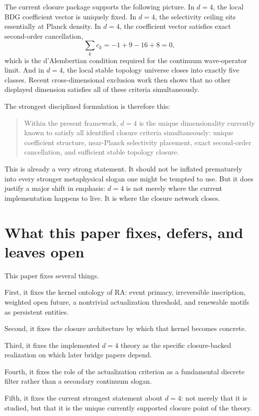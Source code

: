 \documentclass[11pt]{article}
\begin{document}
The current closure package supports the following picture. In $d=4$, the local BDG coefficient vector is uniquely fixed. In $d=4$, the selectivity ceiling sits essentially at Planck density. In $d=4$, the coefficient vector satisfies exact second-order cancellation,
\[
\sum_k c_k = -1 + 9 - 16 + 8 = 0,
\]
which is the d'Alembertian condition required for the continuum wave-operator limit. And in $d=4$, the local stable topology universe closes into exactly five classes. Recent cross-dimensional exclusion work then shows that no other displayed dimension satisfies all of these criteria simultaneously.

The strongest disciplined formulation is therefore this:
\begin{quote}
Within the present framework, $d=4$ is the unique dimensionality currently known to satisfy all identified closure criteria simultaneously: unique coefficient structure, near-Planck selectivity placement, exact second-order cancellation, and sufficient stable topology closure.
\end{quote}

This is already a very strong statement. It should not be inflated prematurely into every stronger metaphysical slogan one might be tempted to use. But it does justify a major shift in emphasis: $d=4$ is not merely where the current implementation happens to live. It is where the closure network closes.

\section{What this paper fixes, defers, and leaves open}\label{sec:scope}
This paper fixes several things.

First, it fixes the kernel ontology of RA: event primacy, irreversible inscription, weighted open future, a nontrivial actualization threshold, and renewable motifs as persistent entities.

Second, it fixes the closure architecture by which that kernel becomes concrete.

Third, it fixes the implemented $d=4$ theory as the specific closure-backed realization on which later bridge papers depend.

Fourth, it fixes the role of the actualization criterion as a fundamental discrete filter rather than a secondary continuum slogan.

Fifth, it fixes the current strongest statement about $d=4$: not merely that it is studied, but that it is the unique currently supported closure point of the theory.
\end{document}
